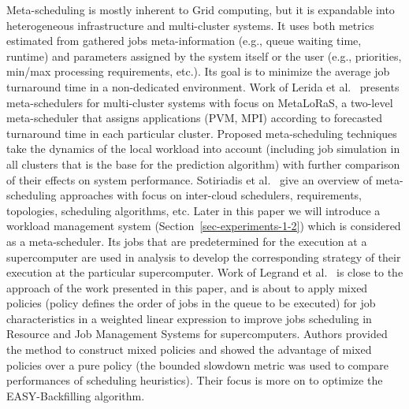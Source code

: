 Meta-scheduling is mostly inherent to Grid computing, but it is expandable into
heterogeneous infrastructure and multi-cluster systems.
It uses both metrics estimated from gathered jobs meta-information (e.g., queue
waiting time, runtime) and parameters assigned by the system itself or the user
(e.g., priorities, min/max processing requirements, etc.).
Its goal is to minimize the average job turnaround time in a non-dedicated
environment.
Work of Lerida et al.~\cite{ref-lerida} presents meta-schedulers for
multi-cluster systems with focus on MetaLoRaS, a two-level meta-scheduler that
assigns applications (PVM, MPI) according to forecasted turnaround time in each
particular cluster.
Proposed meta-scheduling techniques take the dynamics of the local workload
into account (including job simulation in all clusters that is the base for the
prediction algorithm) with further comparison of their effects on system
performance.
Sotiriadis et al.~\cite{ref-sotiriadis} give an overview of meta-scheduling
approaches with focus on inter-cloud schedulers, requirements, topologies,
scheduling algorithms, etc.
Later in this paper we will introduce a workload management system
(Section~\ref{sec-experiments-1-2}) which is considered as a meta-scheduler.
Its jobs that are predetermined for the execution at a supercomputer are used
in analysis to develop the corresponding strategy of their execution at the
particular supercomputer.
Work of Legrand et al.~\cite{ref-legrand} is close to the approach of the work
presented in this paper, and is about to apply mixed policies (policy defines
the order of jobs in the queue to be executed) for job characteristics in a
weighted linear expression to improve jobs scheduling in Resource and Job
Management Systems for supercomputers.
Authors provided the method to construct mixed policies and showed the
advantage of mixed policies over a pure policy (the bounded slowdown metric was
used to compare performances of scheduling heuristics).
Their focus is more on to optimize the EASY-Backfilling algorithm.
